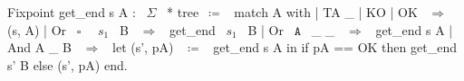 \begin{coqcode}
  Fixpoint get_end s A : ~$\Sigma$~ * tree~$\coloneq$~
    match A with
    | TA _ | KO | OK ~$\Rightarrow$~ (s, A)
    | Or ~$\square$~ ~$s_1$~ B ~$\Rightarrow$~ get_end ~$s_1$~ B
    | Or ~$\boxed{\texttt{A}}$~ _ _ ~$\Rightarrow$~ get_end s A
    | And A _ B ~$\Rightarrow$~ 
      let (s', pA) ~$\coloneq$~ get_end s A in
      if pA == OK then get_end s' B
      else (s', pA)
    end.
\end{coqcode}
